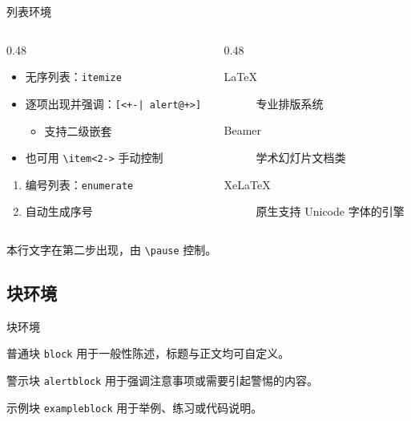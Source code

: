 \documentclass[aspectratio=169]{beamer}
\begin{document}
\begin{frame}{列表环境}
    \begin{columns}[t]
        \begin{column}{0.48\textwidth}
            \begin{itemize}[<+-| alert@+>]
                \item 无序列表：\texttt{itemize}
                \item 逐项出现并强调：\texttt{[<+-| alert@+>]}
                      \begin{itemize}
                          \item 支持二级嵌套
                      \end{itemize}
                \item 也可用 \texttt{\textbackslash item<2->} 手动控制
            \end{itemize}
            \begin{enumerate}
                \item 编号列表：\texttt{enumerate}
                \item 自动生成序号
            \end{enumerate}
        \end{column}
        \begin{column}{0.48\textwidth}
            \begin{description}
                \item[LaTeX] 专业排版系统
                \item[Beamer] 学术幻灯片文档类
                \item[XeLaTeX] 原生支持 Unicode 字体的引擎
            \end{description}
        \end{column}
    \end{columns}
    \vspace{1em}
    \pause
    本行文字在第二步出现，由 \texttt{\textbackslash pause} 控制。
\end{frame}

\subsection{块环境}

\begin{frame}{块环境}
    \begin{block}{普通块 \texttt{block}}
        用于一般性陈述，标题与正文均可自定义。
    \end{block}
    \begin{alertblock}{警示块 \texttt{alertblock}}
        用于强调注意事项或需要引起警惕的内容。
    \end{alertblock}
    \begin{exampleblock}{示例块 \texttt{exampleblock}}
        用于举例、练习或代码说明。
    \end{exampleblock}
\end{frame}
\end{document}
